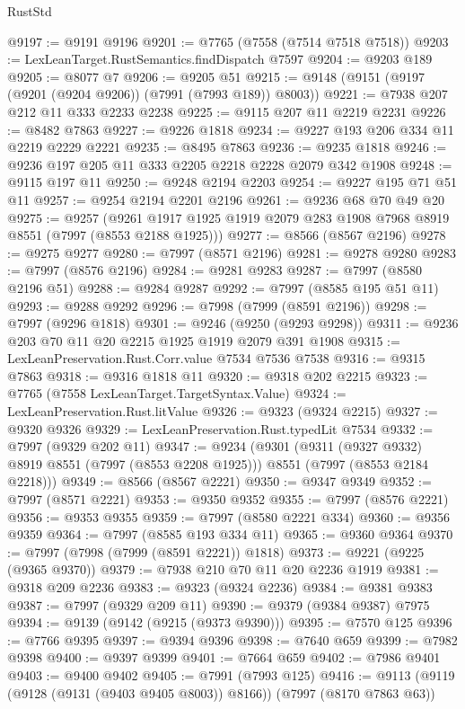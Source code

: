 \begin{lexlean}{RustStd}
\begin{coremodule}
{\begin{coremodule}
{{{{{{{{{{{{{{{{{{{{{{{{{{{{{{{{{{{{{{{{{{{@9197 := @9191 @9196
@9201 := @7765 (@7558 (@7514 @7518 @7518))
@9203 := LexLeanTarget.RustSemantics.findDispatch @7597
@9204 := @9203 @189
@9205 := @8077 @7
@9206 := @9205 @51
@9215 := @9148 (@9151 (@9197 (@9201 (@9204 @9206)) (@7991 (@7993 @189)) @8003))
@9221 := @7938 @207 @212 @11 @333 @2233 @2238
@9225 := @9115 @207 @11 @2219 @2231
@9226 := @8482 @7863
@9227 := @9226 @1818
@9234 := @9227 @193 @206 @334 @11 @2219 @2229 @2221
@9235 := @8495 @7863
@9236 := @9235 @1818
@9246 := @9236 @197 @205 @11 @333 @2205 @2218 @2228 @2079 @342 @1908
@9248 := @9115 @197 @11
@9250 := @9248 @2194 @2203
@9254 := @9227 @195 @71 @51 @11
@9257 := @9254 @2194 @2201 @2196
@9261 := @9236 @68 @70 @49 @20
@9275 := @9257
    (@9261 @1917 @1925 @1919 @2079 @283 @1908 @7968 @8919 @8551 (@7997 (@8553 @2188 @1925)))
@9277 := @8566 (@8567 @2196)
@9278 := @9275 @9277
@9280 := @7997 (@8571 @2196)
@9281 := @9278 @9280
@9283 := @7997 (@8576 @2196)
@9284 := @9281 @9283
@9287 := @7997 (@8580 @2196 @51)
@9288 := @9284 @9287
@9292 := @7997 (@8585 @195 @51 @11)
@9293 := @9288 @9292
@9296 := @7998 (@7999 (@8591 @2196))
@9298 := @7997 (@9296 @1818)
@9301 := @9246 (@9250 (@9293 @9298))
@9311 := @9236 @203 @70 @11 @20 @2215 @1925 @1919 @2079 @391 @1908
@9315 := LexLeanPreservation.Rust.Corr.value @7534 @7536 @7538
@9316 := @9315 @7863
@9318 := @9316 @1818 @11
@9320 := @9318 @202 @2215
@9323 := @7765 (@7558 LexLeanTarget.TargetSyntax.Value)
@9324 := LexLeanPreservation.Rust.litValue
@9326 := @9323 (@9324 @2215)
@9327 := @9320 @9326
@9329 := LexLeanPreservation.Rust.typedLit @7534
@9332 := @7997 (@9329 @202 @11)
@9347 := @9234
    (@9301
      (@9311 (@9327 @9332) @8919 @8551 (@7997 (@8553 @2208 @1925)))
      @8551
      (@7997 (@8553 @2184 @2218)))
@9349 := @8566 (@8567 @2221)
@9350 := @9347 @9349
@9352 := @7997 (@8571 @2221)
@9353 := @9350 @9352
@9355 := @7997 (@8576 @2221)
@9356 := @9353 @9355
@9359 := @7997 (@8580 @2221 @334)
@9360 := @9356 @9359
@9364 := @7997 (@8585 @193 @334 @11)
@9365 := @9360 @9364
@9370 := @7997 (@7998 (@7999 (@8591 @2221)) @1818)
@9373 := @9221 (@9225 (@9365 @9370))
@9379 := @7938 @210 @70 @11 @20 @2236 @1919
@9381 := @9318 @209 @2236
@9383 := @9323 (@9324 @2236)
@9384 := @9381 @9383
@9387 := @7997 (@9329 @209 @11)
@9390 := @9379 (@9384 @9387) @7975
@9394 := @9139 (@9142 (@9215 (@9373 @9390)))
@9395 := @7570 @125
@9396 := @7766 @9395
@9397 := @9394 @9396
@9398 := @7640 @659
@9399 := @7982 @9398
@9400 := @9397 @9399
@9401 := @7664 @659
@9402 := @7986 @9401
@9403 := @9400 @9402
@9405 := @7991 (@7993 @125)
@9416 := @9113 (@9119 (@9128 (@9131 (@9403 @9405 @8003)) @8166)) (@7997 (@8170 @7863 @63))
}}}}}}}}}}}}}}}}}}}}}}}}}}}}}}}}}}}}}}}}}}}
\end{coremodule}}
\end{coremodule}
\end{lexlean}
